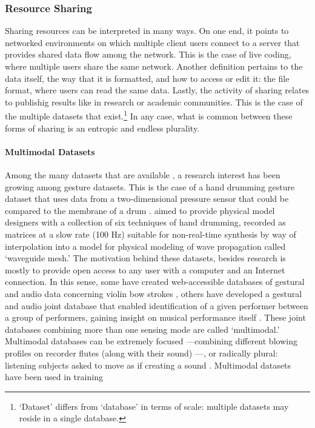 \subsubsection{Resource Sharing}
{
	Sharing resources can be interpreted in many ways. On one end, it points to networked environments on which multiple client users connect to a server that provides shared data flow among the network. This is the case of live coding, where multiple users share the same network. Another definition pertains to the data itself, the way that it is formatted, and how to access or edit it: the file format, where users can read the same data. Lastly, the activity of sharing relates to publishig results like in research or academic communities. This is the case of the multiple datasets that exist.\footnote{`Dataset' differs from `database' in terms of scale: multiple datasets may reside in a single database.} In any case, what is common between these forms of sharing is an entropic and endless plurality.

	\paragraph{Multimodal Datasets}
	Among the many datasets that are available , a research interest has been growing among gesture datasets. This is the case of a hand drumming gesture dataset that uses data from a two-dimensional pressure sensor that could be compared to the membrane of a drum \parencite{DBLP:conf/icmc/JonesLS07}. \citeauthor{DBLP:conf/icmc/JonesLS07} aimed to provide physical model designers with a collection of six techniques of hand drumming, recorded as matrices at a slow rate (100 Hz) suitable for non-real-time synthesis by way of interpolation into a model for physical modeling of wave propagation called `waveguide mesh.' The motivation behind these datasets, besides research is mostly to provide open access to any user with a computer and an Internet connection. In this sense, some have created web-accessible databases of gestural and audio data concerning violin bow strokes \parencite{Young2007}, others have developed a gestural and audio joint database that enabled identification of a given performer between a group of performers, gaining insight on musical performance itself \parencite{Hochenbaum2010}. These joint databases combining more than one sensing mode are called `multimodal.' Multimodal databases can be extremely focused ---combining different blowing profiles on recorder flutes (along with their sound) \parencite{Garcia2011}---, or radically plural: listening subjects asked to move as if creating a sound \parencite{fvisi:2017}. Multimodal datasets have been used in training \parencite{DBLP:conf/icmc/SchonerCDG98}

}
